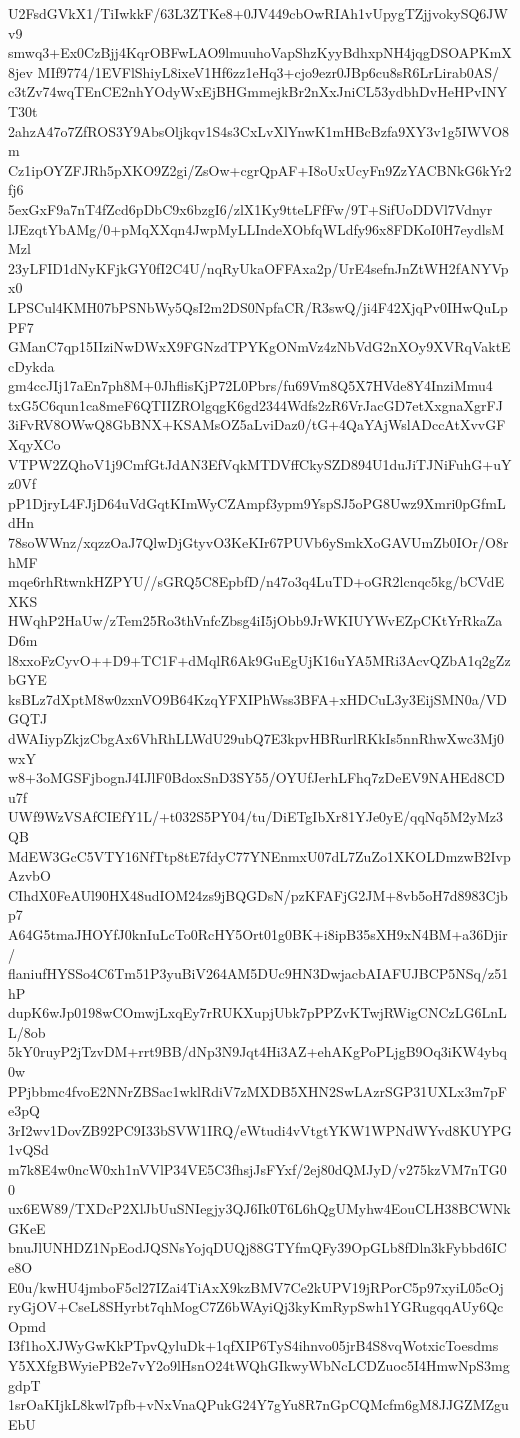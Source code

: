 U2FsdGVkX1/TiIwkkF/63L3ZTKe8+0JV449cbOwRIAh1vUpygTZjjvokySQ6JWv9
smwq3+Ex0CzBjj4KqrOBFwLAO9lmuuhoVapShzKyyBdhxpNH4jqgDSOAPKmX8jev
MIf9774/1EVFlShiyL8ixeV1Hf6zz1eHq3+cjo9ezr0JBp6cu8sR6LrLirab0AS/
c3tZv74wqTEnCE2nhYOdyWxEjBHGmmejkBr2nXxJniCL53ydbhDvHeHPvINYT30t
2ahzA47o7ZfROS3Y9AbsOljkqv1S4s3CxLvXlYnwK1mHBcBzfa9XY3v1g5IWVO8m
Cz1ipOYZFJRh5pXKO9Z2gi/ZsOw+cgrQpAF+I8oUxUcyFn9ZzYACBNkG6kYr2fj6
5exGxF9a7nT4fZcd6pDbC9x6bzgI6/zlX1Ky9tteLFfFw/9T+SifUoDDVl7Vdnyr
lJEzqtYbAMg/0+pMqXXqn4JwpMyLLIndeXObfqWLdfy96x8FDKoI0H7eydlsMMzl
23yLFID1dNyKFjkGY0fI2C4U/nqRyUkaOFFAxa2p/UrE4sefnJnZtWH2fANYVpx0
LPSCul4KMH07bPSNbWy5QsI2m2DS0NpfaCR/R3swQ/ji4F42XjqPv0IHwQuLpPF7
GManC7qp15IIziNwDWxX9FGNzdTPYKgONmVz4zNbVdG2nXOy9XVRqVaktEcDykda
gm4ccJIj17aEn7ph8M+0JhflisKjP72L0Pbrs/fu69Vm8Q5X7HVde8Y4InziMmu4
txG5C6qun1ca8meF6QTIIZROlgqgK6gd2344Wdfs2zR6VrJacGD7etXxgnaXgrFJ
3iFvRV8OWwQ8GbBNX+KSAMsOZ5aLviDaz0/tG+4QaYAjWslADccAtXvvGFXqyXCo
VTPW2ZQhoV1j9CmfGtJdAN3EfVqkMTDVffCkySZD894U1duJiTJNiFuhG+uYz0Vf
pP1DjryL4FJjD64uVdGqtKImWyCZAmpf3ypm9YspSJ5oPG8Uwz9Xmri0pGfmLdHn
78soWWnz/xqzzOaJ7QlwDjGtyvO3KeKIr67PUVb6ySmkXoGAVUmZb0IOr/O8rhMF
mqe6rhRtwnkHZPYU//sGRQ5C8EpbfD/n47o3q4LuTD+oGR2lcnqc5kg/bCVdEXKS
HWqhP2HaUw/zTem25Ro3thVnfcZbsg4iI5jObb9JrWKIUYWvEZpCKtYrRkaZaD6m
l8xxoFzCyvO++D9+TC1F+dMqlR6Ak9GuEgUjK16uYA5MRi3AcvQZbA1q2gZzbGYE
ksBLz7dXptM8w0zxnVO9B64KzqYFXIPhWss3BFA+xHDCuL3y3EijSMN0a/VDGQTJ
dWAIiypZkjzCbgAx6VhRhLLWdU29ubQ7E3kpvHBRurlRKkIs5nnRhwXwc3Mj0wxY
w8+3oMGSFjbognJ4IJlF0BdoxSnD3SY55/OYUfJerhLFhq7zDeEV9NAHEd8CDu7f
UWf9WzVSAfCIEfY1L/+t032S5PY04/tu/DiETgIbXr81YJe0yE/qqNq5M2yMz3QB
MdEW3GcC5VTY16NfTtp8tE7fdyC77YNEnmxU07dL7ZuZo1XKOLDmzwB2IvpAzvbO
CIhdX0FeAUl90HX48udIOM24zs9jBQGDsN/pzKFAFjG2JM+8vb5oH7d8983Cjbp7
A64G5tmaJHOYfJ0knIuLcTo0RcHY5Ort01g0BK+i8ipB35sXH9xN4BM+a36Djir/
flaniufHYSSo4C6Tm51P3yuBiV264AM5DUc9HN3DwjacbAIAFUJBCP5NSq/z51hP
dupK6wJp0198wCOmwjLxqEy7rRUKXupjUbk7pPPZvKTwjRWigCNCzLG6LnLL/8ob
5kY0ruyP2jTzvDM+rrt9BB/dNp3N9Jqt4Hi3AZ+ehAKgPoPLjgB9Oq3iKW4ybq0w
PPjbbmc4fvoE2NNrZBSac1wklRdiV7zMXDB5XHN2SwLAzrSGP31UXLx3m7pFe3pQ
3rI2wv1DovZB92PC9I33bSVW1IRQ/eWtudi4vVtgtYKW1WPNdWYvd8KUYPG1vQSd
m7k8E4w0ncW0xh1nVVlP34VE5C3fhsjJsFYxf/2ej80dQMJyD/v275kzVM7nTG00
ux6EW89/TXDcP2XlJbUuSNIegjy3QJ6Ik0T6L6hQgUMyhw4EouCLH38BCWNkGKeE
bnuJlUNHDZ1NpEodJQSNsYojqDUQj88GTYfmQFy39OpGLb8fDln3kFybbd6ICe8O
E0u/kwHU4jmboF5cl27IZai4TiAxX9kzBMV7Ce2kUPV19jRPorC5p97xyiL05cOj
ryGjOV+CseL8SHyrbt7qhMogC7Z6bWAyiQj3kyKmRypSwh1YGRugqqAUy6QcOpmd
I3f1hoXJWyGwKkPTpvQyluDk+1qfXIP6TyS4ihnvo05jrB4S8vqWotxicToesdms
Y5XXfgBWyiePB2e7vY2o9lHsnO24tWQhGIkwyWbNcLCDZuoc5I4HmwNpS3mggdpT
1srOaKIjkL8kwl7pfb+vNxVnaQPukG24Y7gYu8R7nGpCQMcfm6gM8JJGZMZguEbU
